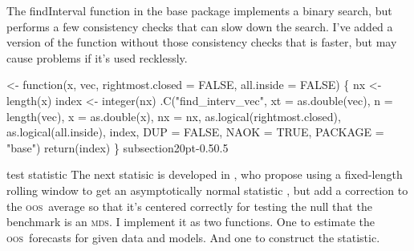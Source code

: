\documentclass[10pt]{article}%
\makeatletter
\newcommand{\mds}{\textsc{mds}}
\newcommand{\oos}{\textsc{oos}}
\renewcommand\subsection{\@startsection%
{subsection}{2}{0pt}{-0.5\baselineskip}{0.5\baselineskip}%
{\normalfont\normalsize\bfseries\small\raggedright}}
\makeatother
\begin{document}
The {\Tt{}findInterval\nwendquote} function in the base package implements a binary
search, but performs a few consistency checks that can slow down the
search.  I've added a version of the function without those
consistency checks that is faster, but may cause problems if it's used
recklessly.

\nwenddocs{}\endmoddef\nwstartdeflinemarkup{}\nwenddeflinemarkup
{} <- 
 function(x, vec, rightmost.closed = FALSE, all.inside = FALSE) \{
    nx <- length(x)
    index <- integer(nx)
    .C("find_interv_vec", xt = as.double(vec), n = length(vec), 
       x = as.double(x), nx = nx, as.logical(rightmost.closed), 
       as.logical(all.inside), index, DUP = FALSE, NAOK = TRUE, 
       PACKAGE = "base")
    return(index)
\}
\eatline
{}\nwendcode{}\nwdocspar
\subsection{\citet{ClW:06,ClW:07} test statistic}
The next statisic is developed in \citet{ClW:06,ClW:07}, who propose
using a fixed-length rolling window to get an asymptotically normal
statistic \citep[as in][]{Giw:06}, but add a correction to the \oos\
average so that it's centered correctly for testing the null that the
benchmark is an \mds.  I implement it as two functions.  One to
estimate the \oos\ forecasts for given data and models.  And one to
construct the statistic.
\end{document}
